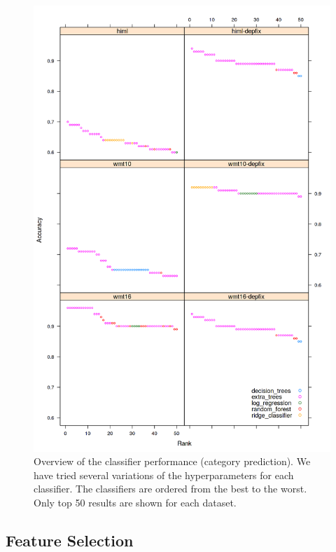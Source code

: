 \begin{figure}
\centering
  \includegraphics[scale=0.7]{cats-class}
  \caption[ML method comparison - Morphological prediction]{
    Overview of the classifier performance (category prediction).
We have tried several variations of the hyperparameters
for each classifier. The classifiers are ordered from the best to the worst. Only top 50 results
are shown for each dataset.
}
  \label{cats-draft}
\end{figure}

\subsection{Feature Selection}

